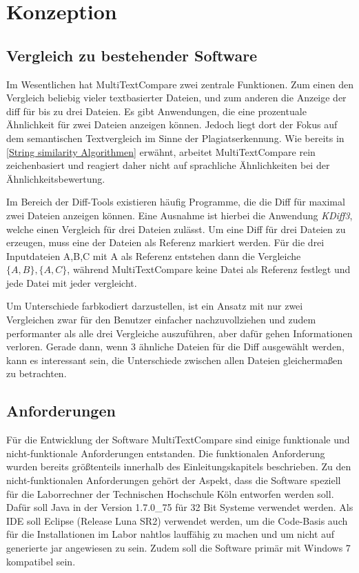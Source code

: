 \section{Konzeption}



\subsection{Vergleich zu bestehender Software}

Im Wesentlichen hat MultiTextCompare zwei zentrale Funktionen. Zum einen den Vergleich beliebig vieler textbasierter Dateien, und zum anderen die Anzeige der \acrshort{diff} für bis zu drei Dateien. Es gibt Anwendungen, die eine prozentuale Ähnlichkeit für zwei Dateien anzeigen können. Jedoch liegt dort der Fokus auf dem semantischen Textvergleich im Sinne der Plagiatserkennung. Wie bereits in \ref{String similarity Algorithmen} erwähnt, arbeitet MultiTextCompare rein zeichenbasiert und reagiert daher nicht auf sprachliche Ähnlichkeiten bei der Ähnlichkeitsbewertung. 

Im Bereich der Diff-Tools existieren häufig Programme, die die Diff für maximal zwei Dateien anzeigen können. Eine Ausnahme ist hierbei die Anwendung \textit{KDiff3}, welche einen Vergleich für drei Dateien zulässt. Um eine Diff für drei Dateien zu erzeugen, muss eine der Dateien als Referenz markiert werden. Für die drei Inputdateien A,B,C mit A als Referenz entstehen dann die Vergleiche $\{A,B\}, \{A,C\}$, während MultiTextCompare keine Datei als Referenz festlegt und jede Datei mit jeder vergleicht. 

Um Unterschiede farbkodiert darzustellen, ist ein Ansatz mit nur zwei Vergleichen zwar für den Benutzer einfacher nachzuvollziehen und zudem performanter als alle drei Vergleiche auszuführen, aber dafür gehen Informationen verloren. Gerade dann, wenn 3 ähnliche Dateien für die Diff ausgewählt werden, kann es interessant sein, die Unterschiede zwischen allen Dateien gleichermaßen zu betrachten.


\subsection{Anforderungen}

Für die Entwicklung der Software MultiTextCompare sind einige funktionale und nicht-funktionale Anforderungen entstanden. Die funktionalen Anforderung wurden bereits größtenteils innerhalb des Einleitungskapitels beschrieben. Zu den nicht-funktionalen Anforderungen gehört der Aspekt, dass die Software speziell für die Laborrechner der Technischen Hochschule Köln entworfen werden soll. Dafür soll Java in der Version 1.7.0\_75 für 32 Bit Systeme verwendet werden. Als IDE soll Eclipse (Release Luna SR2) verwendet werden, um die Code-Basis auch für die Installationen im Labor nahtlos lauffähig zu machen und um nicht auf generierte \acrfull{jar} angewiesen zu sein. Zudem soll die Software primär mit Windows 7 kompatibel sein.

